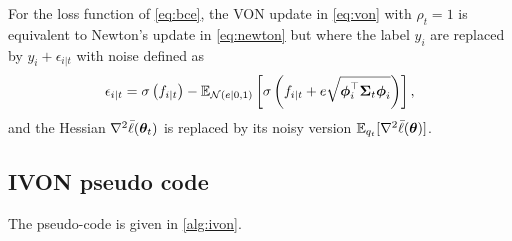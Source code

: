  \begin{thm}
    For the loss function of \cref{eq:bce}, the VON update in \cref{eq:von} with $\rho_t = 1$ is equivalent to Newton's update in \cref{eq:newton} but where the label $y_i$ are replaced by $y_i + \epsilon_{i|t}$ with noise defined as
    \begin{equation}
       \epsilon_{i|t} =  \sigma\left(f_{i|t}\right) - \mathbb{E}_{\text{\mbox{${\cal N}$}}(e|0,1)} \left[\sigma\left(f_{i|t} + e \sqrt{\mbox{$\mbox{$\boldsymbol{\phi}$}$}_i^\top\mbox{$\mbox{$\boldsymbol{\Sigma}$}$}_t \mbox{$\mbox{$\boldsymbol{\phi}$}$}_i}  \right)\right],
       \label{eq:sgd_noise}
    \end{equation}
    and the Hessian $\nabla^2 \bar{\ell}(\boldsymbol{\theta}_t)$ is replaced by its noisy version $\mathbb{E}_{q_t}[\nabla^2 \bar{\ell}(\boldsymbol{\theta})]$.
 \end{thm}
    

\clearpage

\subsection{IVON pseudo code}

The pseudo-code is given in \cref{alg:ivon}.

